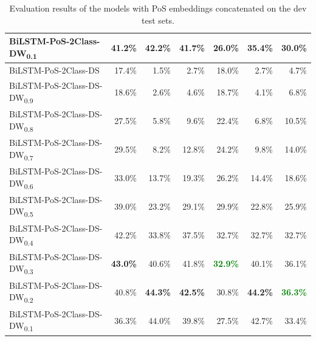 \documentclass[11pt,a4paper]{article}
\begin{document}
\begin{table}
\begin{tabular}{lrrrrrr}
        BiLSTM-PoS-2Class-DW\textsubscript{0.1} & 41.2\% & \textbf{42.2\%} & \textbf{41.7\%} & 26.0\% & \textbf{35.4\%} & \textbf{30.0\%} \\
        \hline
        BiLSTM-PoS-2Class-DS & 17.4\% & 1.5\% & 2.7\% & 18.0\% & 2.7\% & 4.7\% \\
        BiLSTM-PoS-2Class-DS-DW\textsubscript{0.9} & 18.6\% &  2.6\% &  4.6\% & 18.7\% &  4.1\% &  6.8\% \\
        BiLSTM-PoS-2Class-DS-DW\textsubscript{0.8} & 27.5\% &  5.8\% &  9.6\% & 22.4\% &  6.8\% & 10.5\% \\
        BiLSTM-PoS-2Class-DS-DW\textsubscript{0.7} & 29.5\% &  8.2\% & 12.8\% & 24.2\% &  9.8\% & 14.0\% \\
        BiLSTM-PoS-2Class-DS-DW\textsubscript{0.6} & 33.0\% & 13.7\% & 19.3\% & 26.2\% & 14.4\% & 18.6\% \\
        BiLSTM-PoS-2Class-DS-DW\textsubscript{0.5} & 39.0\% & 23.2\% & 29.1\% & 29.9\% & 22.8\% & 25.9\% \\
        BiLSTM-PoS-2Class-DS-DW\textsubscript{0.4} & 42.2\% & 33.8\% & 37.5\% & 32.7\% & 32.7\% & 32.7\% \\
        BiLSTM-PoS-2Class-DS-DW\textsubscript{0.3} & \textbf{43.0\%} & 40.6\% & 41.8\% & \textcolor{Green}{\textbf{32.9\%}} & 40.1\% & 36.1\% \\
        BiLSTM-PoS-2Class-DS-DW\textsubscript{0.2} & 40.8\% & \textbf{44.3\%} & \textbf{42.5\%} & 30.8\% & \textbf{44.2\%} & \textcolor{Green}{\textbf{36.3\%}} \\
        BiLSTM-PoS-2Class-DS-DW\textsubscript{0.1} & 36.3\% & 44.0\% & 39.8\% & 27.5\% & 42.7\% & 33.4\% \\
        \hline
    \end{tabular}
    \caption{Evaluation results of the models with PoS embeddings concatenated on the dev test sets.}
    \label{table:eval-results-pos}
\end{table}
\end{document}
